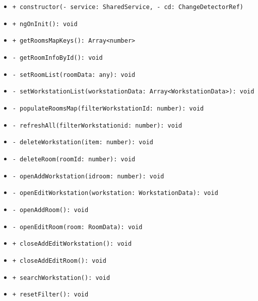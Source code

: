 \begin{itemize}
	\item \texttt{+ constructor(- service: SharedService, - cd: ChangeDetectorRef)} 
	\item \texttt{+ ngOnInit(): void} 
	\item \texttt{+ getRoomsMapKeys(): Array<number>} 
	\item \texttt{- getRoomInfoById(): void} 
	\item \texttt{- setRoomList(roomData: any): void} 
	\item \texttt{- setWorkstationList(workstationData: Array<WorkstationData>): void} 
	\item \texttt{- populateRoomsMap(filterWorkstationId: number): void} 
	\item \texttt{- refreshAll(filterWorkstationid: number): void} 
	\item \texttt{- deleteWorkstation(item: number): void} 
	\item \texttt{- deleteRoom(roomId: number): void} 
	\item \texttt{- openAddWorkstation(idroom: number): void} 
	\item \texttt{- openEditWorkstation(workstation: WorkstationData): void} 
	\item \texttt{- openAddRoom(): void} 
	\item \texttt{- openEditRoom(room: RoomData): void} 
	\item \texttt{+ closeAddEditWorkstation(): void} 
	\item \texttt{+ closeAddEditRoom(): void} 
	\item \texttt{+ searchWorkstation(): void} 
	\item \texttt{+ resetFilter(): void} 
\end{itemize}
	
